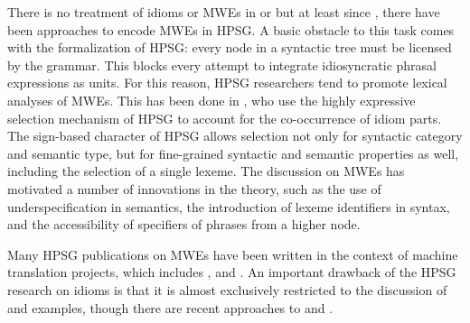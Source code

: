 \documentclass[output=paper]{langsci/langscibook}
\begin{document}
There is no treatment of idioms or MWEs in \citet{Pollard:Sag:87} or \citet{Pollard:Sag:94} but at least since \citet{Krenn:Erbach:94}, there have been approaches to encode MWEs in HPSG. A basic obstacle to this task comes with the formalization of HPSG: every node in a syntactic tree must be licensed by the grammar. This blocks every attempt to integrate idiosyncratic phrasal expressions as units. For this reason, HPSG researchers tend to promote lexical analyses of MWEs. This has been done in \citet{Krenn:Erbach:94}, who use the highly expressive selection mechanism of HPSG to account for the co-occurrence of idiom parts. The sign-based character of HPSG allows selection not only for syntactic category and semantic type, but for fine-grained syntactic and semantic properties as well, including the selection of a single lexeme. The discussion on MWEs has motivated a number of innovations in the theory, such as the use of underspecification in semantics, the introduction of lexeme identifiers in syntax, and the accessibility of specifiers of phrases from a higher node.

Many HPSG publications on MWEs have been written in the context of machine translation projects, which includes \citet{Krenn:Erbach:94}, \citet{Copestake:al:95} and \citet{Sag:2002}.  An important drawback of the HPSG research on idioms is that it is almost exclusively restricted to the discussion of  and  examples, though there are recent approaches to  \citep{Sheinfux:al:15}  and   \citep{Haugereid:Bond:11}.
\end{document}

